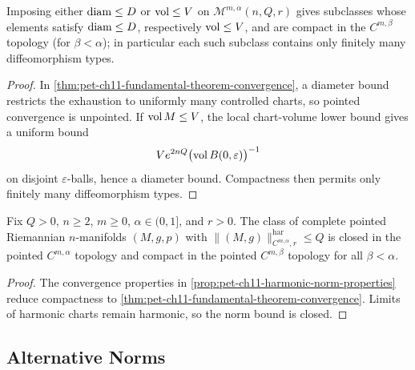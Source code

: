 \begin{corollary}
  \label{cor:pet-ch11-fundamental-thm-diam-vol-bounded}

  Imposing either $\operatorname{diam}\le D$ or $\operatorname{vol}\le V$ on
  $\mathcal{M}^{m,\alpha}(n,Q,r)$ gives subclasses whose elements satisfy
  $\operatorname{diam}\le D$, respectively $\operatorname{vol}\le V$, and are compact in the
  $C^{m,\beta}$ topology (for $\beta<\alpha$); in particular each such
  subclass contains only finitely many diffeomorphism types.
\end{corollary}
\begin{proof}
  \sketch
  In \cref{thm:pet-ch11-fundamental-theorem-convergence}, a diameter bound restricts the exhaustion to uniformly many controlled charts, so pointed convergence is unpointed. If \(\operatorname{vol} M\le V\), the local chart-volume lower bound gives a uniform bound
  \[
    V e^{2nQ}\bigl(\operatorname{vol} B(0,\varepsilon)\bigr)^{-1}
  \]
  on disjoint \(\varepsilon\)-balls, hence a diameter bound. Compactness then permits only finitely many diffeomorphism types.
\end{proof}


\begin{corollary}
  \label{cor:pet-ch11-harmonic-norm-class-compact}

  Fix $Q>0$, $n\ge2$, $m\ge0$, $\alpha\in(0,1]$, and $r>0$. The class of complete
  pointed Riemannian $n$-manifolds $(M,g,p)$ with
  $\|(M,g)\|^{\mathrm{har}}_{C^{m,\alpha},r}\le Q$ is closed in the pointed
  $C^{m,\alpha}$ topology and compact in the pointed $C^{m,\beta}$ topology
  for all $\beta<\alpha$.
\end{corollary}
\begin{proof}
  \sketch
  The convergence properties in \cref{prop:pet-ch11-harmonic-norm-properties} reduce compactness to \cref{thm:pet-ch11-fundamental-theorem-convergence}. Limits of harmonic charts remain harmonic, so the norm bound is closed.
\end{proof}


\subsection{Alternative Norms}


